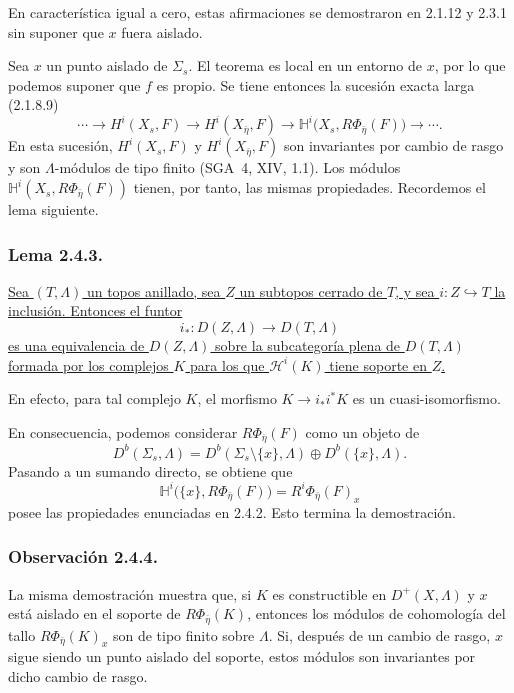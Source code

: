 En característica igual a cero, estas afirmaciones se demostraron en 2.1.12
y 2.3.1 sin suponer que $x$ fuera aislado.

Sea $x$ un punto aislado de $\Sigma_s$. El teorema es local en un entorno de
$x$, por lo que podemos suponer que $f$ es propio. Se tiene entonces la
sucesión exacta larga (2.1.8.9)
\[
\cdots\longrightarrow H^i(X_s,F)
\longrightarrow H^i(X_{\bar\eta},F)
\longrightarrow
\mathbb H^i\bigl(X_s,R\Phi_{\bar\eta}(F)\bigr)
\longrightarrow\cdots .
\]
En esta sucesión, $H^i(X_s,F)$ y $H^i(X_{\bar\eta},F)$ son invariantes por
cambio de rasgo y son $\Lambda$-módulos de tipo finito (SGA~4, XIV, 1.1). Los
módulos $\mathbb H^i(X_s,R\Phi_{\bar\eta}(F))$ tienen, por tanto, las mismas
propiedades. Recordemos el lema siguiente.

\subsubsection*{Lema 2.4.3.}
\underline{Sea $(T,\Lambda)$ un topos anillado, sea $Z$ un subtopos cerrado
de $T$, y sea $i:Z\hookrightarrow T$ la inclusión. Entonces el funtor}
\[
i_*:D(Z,\Lambda)\longrightarrow D(T,\Lambda)
\]
\underline{es una equivalencia de $D(Z,\Lambda)$ sobre la subcategoría plena
de $D(T,\Lambda)$ formada por los complejos $K$ para los que
$\mathcal H^i(K)$ tiene soporte en $Z$.}

En efecto, para tal complejo $K$, el morfismo
$K\longrightarrow i_*i^*K$ es un cuasi-isomorfismo.

En consecuencia, podemos considerar $R\Phi_{\bar\eta}(F)$ como un objeto de
\[
D^b(\Sigma_s,\Lambda)
=D^b(\Sigma_s\setminus\{x\},\Lambda)\oplus D^b(\{x\},\Lambda).
\]
Pasando a un sumando directo, se obtiene que
\[
\mathbb H^i\bigl(\{x\},R\Phi_{\bar\eta}(F)\bigr)
=R^i\Phi_{\bar\eta}(F)_x
\]
posee las propiedades enunciadas en 2.4.2. Esto termina la demostración.

\subsubsection*{Observación 2.4.4.}
La misma demostración muestra que, si $K$ es constructible en
$D^+(X,\Lambda)$ y $x$ está aislado en el soporte de
$R\Phi_{\bar\eta}(K)$, entonces los módulos de cohomología del tallo
$R\Phi_{\bar\eta}(K)_x$ son de tipo finito sobre $\Lambda$. Si, después de
un cambio de rasgo, $x$ sigue siendo un punto aislado del soporte, estos
módulos son invariantes por dicho cambio de rasgo.

\pageoriginale

